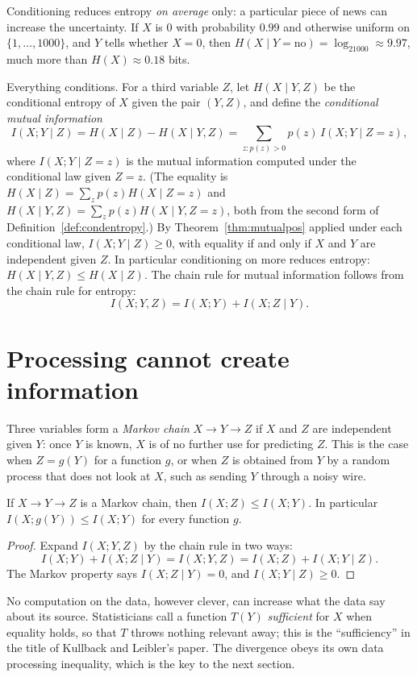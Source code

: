 Conditioning reduces entropy \emph{on average} only: a particular piece of news can increase the uncertainty. If $X$ is $0$ with probability $0.99$ and otherwise uniform on $\{1,\dots,1000\}$, and $Y$ tells whether $X=0$, then $H(X\mid Y=\text{no})=\log_21000\approx9.97$, much more than $H(X)\approx0.18$ bits.

Everything conditions. For a third variable $Z$, let $H(X\mid Y,Z)$ be the conditional entropy of $X$ given the pair $(Y,Z)$, and define the \emph{conditional mutual information}
\[
I(X;Y\mid Z)=H(X\mid Z)-H(X\mid Y,Z)=\sum_{z:p(z)>0}p(z)\,I(X;Y\mid Z=z),
\]
where $I(X;Y\mid Z=z)$ is the mutual information computed under the conditional law given $Z=z$. (The equality is $H(X\mid Z)=\sum_zp(z)H(X\mid Z=z)$ and $H(X\mid Y,Z)=\sum_zp(z)H(X\mid Y,Z=z)$, both from the second form of Definition~\ref{def:condentropy}.) By Theorem~\ref{thm:mutualpos} applied under each conditional law, $I(X;Y\mid Z)\ge0$, with equality if and only if $X$ and $Y$ are independent given $Z$. In particular conditioning on more reduces entropy: $H(X\mid Y,Z)\le H(X\mid Z)$. The chain rule for mutual information follows from the chain rule for entropy:
\[
I(X;Y,Z)=I(X;Y)+I(X;Z\mid Y).
\]

\section{Processing cannot create information}\label{sec:dataprocessing}

Three variables form a \emph{Markov chain} $X\to Y\to Z$ if $X$ and $Z$ are independent given $Y$: once $Y$ is known, $X$ is of no further use for predicting $Z$. This is the case when $Z=g(Y)$ for a function $g$, or when $Z$ is obtained from $Y$ by a random process that does not look at $X$, such as sending $Y$ through a noisy wire.

\begin{theorem}\label{thm:dataprocessing}
If $X\to Y\to Z$ is a Markov chain, then $I(X;Z)\le I(X;Y)$. In particular $I(X;g(Y))\le I(X;Y)$ for every function $g$.
\end{theorem}

\begin{proof}
Expand $I(X;Y,Z)$ by the chain rule in two ways:
\[
I(X;Y)+I(X;Z\mid Y)=I(X;Y,Z)=I(X;Z)+I(X;Y\mid Z).
\]
The Markov property says $I(X;Z\mid Y)=0$, and $I(X;Y\mid Z)\ge0$.
\end{proof}

No computation on the data, however clever, can increase what the data say about its source. Statisticians call a function $T(Y)$ \emph{sufficient} for $X$ when equality holds, so that $T$ throws nothing relevant away; this is the ``sufficiency'' in the title of Kullback and Leibler's paper. The divergence obeys its own data processing inequality, which is the key to the next section.

